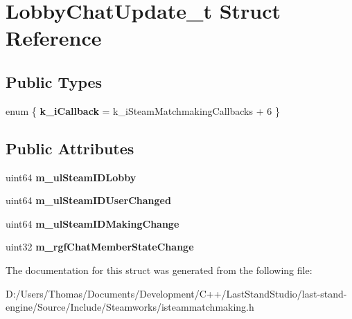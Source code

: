 \hypertarget{structLobbyChatUpdate__t}{}\section{Lobby\+Chat\+Update\+\_\+t Struct Reference}
\label{structLobbyChatUpdate__t}
\subsection*{Public Types}
\begin{DoxyCompactItemize}
\item 
\hypertarget{structLobbyChatUpdate__t_abb6f767323ac2bce92617f2256d6cb5e}{}enum \{ {\bfseries k\+\_\+i\+Callback} = k\+\_\+i\+Steam\+Matchmaking\+Callbacks + 6
 \}\label{structLobbyChatUpdate__t_abb6f767323ac2bce92617f2256d6cb5e}

\end{DoxyCompactItemize}
\subsection*{Public Attributes}
\begin{DoxyCompactItemize}
\item 
\hypertarget{structLobbyChatUpdate__t_a4be7b82a5e5e2c35d17c6e80973fe4e9}{}uint64 {\bfseries m\+\_\+ul\+Steam\+I\+D\+Lobby}\label{structLobbyChatUpdate__t_a4be7b82a5e5e2c35d17c6e80973fe4e9}

\item 
\hypertarget{structLobbyChatUpdate__t_a4848bc41e96a111828415b58d4fe965e}{}uint64 {\bfseries m\+\_\+ul\+Steam\+I\+D\+User\+Changed}\label{structLobbyChatUpdate__t_a4848bc41e96a111828415b58d4fe965e}

\item 
\hypertarget{structLobbyChatUpdate__t_a73daa7411f3a610080a3b37b6b63ac40}{}uint64 {\bfseries m\+\_\+ul\+Steam\+I\+D\+Making\+Change}\label{structLobbyChatUpdate__t_a73daa7411f3a610080a3b37b6b63ac40}

\item 
\hypertarget{structLobbyChatUpdate__t_a351c645035e4ed95f9d2e542728036cd}{}uint32 {\bfseries m\+\_\+rgf\+Chat\+Member\+State\+Change}\label{structLobbyChatUpdate__t_a351c645035e4ed95f9d2e542728036cd}

\end{DoxyCompactItemize}


The documentation for this struct was generated from the following file\+:\begin{DoxyCompactItemize}
\item 
D\+:/\+Users/\+Thomas/\+Documents/\+Development/\+C++/\+Last\+Stand\+Studio/last-\/stand-\/engine/\+Source/\+Include/\+Steamworks/isteammatchmaking.\+h\end{DoxyCompactItemize}
